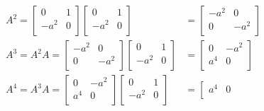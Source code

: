 \begin{example}
  \begin{equation*}
    \begin{split}
      A^{2}=
      \left[
        \begin{array}{cc}
          0 & 1 \\
          -a^{2} & 0 \\
        \end{array}
      \right]
      \left[
        \begin{array}{cc}
          0 & 1 \\
          -a^{2} & 0 \\
        \end{array}
      \right]&=
      \left[
        \begin{array}{cc}
          -a^{2} &0 \\
          0 & -a^{2} \\
        \end{array}
      \right] \\
      A^{3}=A^{2}A=
      \left[
        \begin{array}{cc}
          -a^{2} &0 \\
          0 & -a^{2} \\
        \end{array}
      \right]
      \left[
        \begin{array}{cc}
          0 & 1 \\
          -a^{2} & 0 \\
        \end{array}
      \right]&=
      \left[
        \begin{array}{cc}
          0 & -a^{2} \\
          a^{4} & 0 \\
        \end{array}
      \right] \\
      A^{4}=A^{3}A=
      \left[
        \begin{array}{cc}
          0 & -a^{2} \\
          a^{4} & 0 \\
        \end{array}
      \right]
      \left[
        \begin{array}{cc}
          0 & 1 \\
          -a^{2} & 0 \\
        \end{array}
      \right]&=
      \left[
        \begin{array}{cc}
          a^{4} & 0 \\

\end{array}
\end{split}
\end{equation*}
\end{example}
